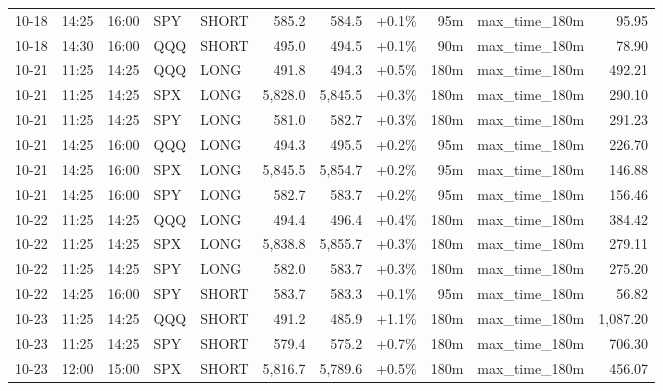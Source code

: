 \documentclass[11pt,a4paper,twoside]{article}
\begin{document}
\begin{center}
\begin{longtable}{>{\color{txtmain}}l l l l l r r r r >{\color{txtmain}}l r}
10-18 & 14:25 & 16:00 & SPY & SHORT & 585.2 & 584.5 & \textcolor{wingreen}{+0.1\%} & 95m & max\_time\_180m & \textcolor{wingreen}{95.95} \\
10-18 & 14:30 & 16:00 & QQQ & SHORT & 495.0 & 494.5 & \textcolor{wingreen}{+0.1\%} & 90m & max\_time\_180m & \textcolor{wingreen}{78.90} \\
10-21 & 11:25 & 14:25 & QQQ & LONG & 491.8 & 494.3 & \textcolor{wingreen}{+0.5\%} & 180m & max\_time\_180m & \textcolor{wingreen}{492.21} \\
10-21 & 11:25 & 14:25 & SPX & LONG & 5,828.0 & 5,845.5 & \textcolor{wingreen}{+0.3\%} & 180m & max\_time\_180m & \textcolor{wingreen}{290.10} \\
10-21 & 11:25 & 14:25 & SPY & LONG & 581.0 & 582.7 & \textcolor{wingreen}{+0.3\%} & 180m & max\_time\_180m & \textcolor{wingreen}{291.23} \\
10-21 & 14:25 & 16:00 & QQQ & LONG & 494.3 & 495.5 & \textcolor{wingreen}{+0.2\%} & 95m & max\_time\_180m & \textcolor{wingreen}{226.70} \\
10-21 & 14:25 & 16:00 & SPX & LONG & 5,845.5 & 5,854.7 & \textcolor{wingreen}{+0.2\%} & 95m & max\_time\_180m & \textcolor{wingreen}{146.88} \\
10-21 & 14:25 & 16:00 & SPY & LONG & 582.7 & 583.7 & \textcolor{wingreen}{+0.2\%} & 95m & max\_time\_180m & \textcolor{wingreen}{156.46} \\
10-22 & 11:25 & 14:25 & QQQ & LONG & 494.4 & 496.4 & \textcolor{wingreen}{+0.4\%} & 180m & max\_time\_180m & \textcolor{wingreen}{384.42} \\
10-22 & 11:25 & 14:25 & SPX & LONG & 5,838.8 & 5,855.7 & \textcolor{wingreen}{+0.3\%} & 180m & max\_time\_180m & \textcolor{wingreen}{279.11} \\
10-22 & 11:25 & 14:25 & SPY & LONG & 582.0 & 583.7 & \textcolor{wingreen}{+0.3\%} & 180m & max\_time\_180m & \textcolor{wingreen}{275.20} \\
10-22 & 14:25 & 16:00 & SPY & SHORT & 583.7 & 583.3 & \textcolor{wingreen}{+0.1\%} & 95m & max\_time\_180m & \textcolor{wingreen}{56.82} \\
10-23 & 11:25 & 14:25 & QQQ & SHORT & 491.2 & 485.9 & \textcolor{wingreen}{+1.1\%} & 180m & max\_time\_180m & \textcolor{wingreen}{1,087.20} \\
10-23 & 11:25 & 14:25 & SPY & SHORT & 579.4 & 575.2 & \textcolor{wingreen}{+0.7\%} & 180m & max\_time\_180m & \textcolor{wingreen}{706.30} \\
10-23 & 12:00 & 15:00 & SPX & SHORT & 5,816.7 & 5,789.6 & \textcolor{wingreen}{+0.5\%} & 180m & max\_time\_180m & \textcolor{wingreen}{456.07} \\

\end{longtable}
\end{center}
\end{document}
